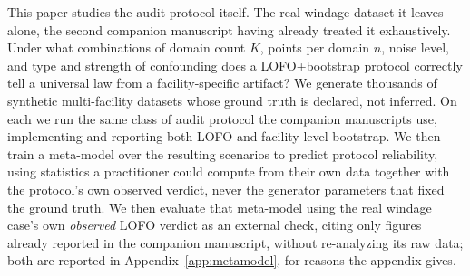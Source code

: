 \documentclass[journal=dce]{CUP-JNL-DTM}%
\begin{document}
This paper studies the audit protocol itself. The real windage dataset it leaves alone, the second companion manuscript having already treated it exhaustively. Under what combinations of domain count $K$, points per domain $n$, noise level, and type and strength of confounding does a LOFO+bootstrap protocol correctly tell a universal law from a facility-specific artifact? We generate thousands of synthetic multi-facility datasets whose ground truth is declared, not inferred. On each we run the same class of audit protocol the companion manuscripts use, implementing and reporting both LOFO and facility-level bootstrap. We then train a meta-model over the resulting scenarios to predict protocol reliability, using statistics a practitioner could compute from their own data together with the protocol's own observed verdict, never the generator parameters that fixed the ground truth. We then evaluate that meta-model using the real windage case's own \emph{observed} LOFO verdict as an external check, citing only figures already reported in the companion manuscript, without re-analyzing its raw data; both are reported in Appendix~\ref{app:metamodel}, for reasons the appendix gives.
\end{document}
